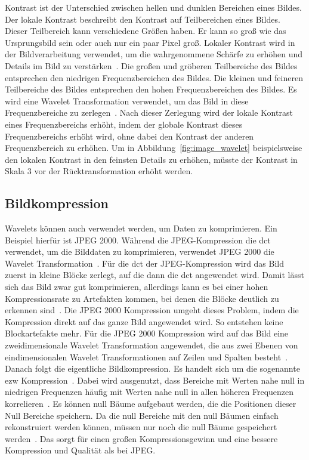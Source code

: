 \documentclass[12pt, a4paper, ngerman]{article}
\begin{document}
Kontrast ist der Unterschied zwischen hellen
und dunklen Bereichen eines Bildes.
Der lokale Kontrast beschreibt
den Kontrast auf Teilbereichen eines Bildes.
Dieser Teilbereich kann verschiedene Größen haben.
Er kann so groß wie das Ursprungsbild sein
oder auch nur ein paar Pixel groß.
Lokaler Kontrast wird in der Bildverarbeitung verwendet, um
die wahrgenommene Schärfe zu erhöhen
und Details im Bild zu verstärken~\cite[S.108]{dt_manual}.
Die großen und gröberen Teilbereiche des Bildes
entsprechen den niedrigen Frequenzbereichen des Bildes.
Die kleinen und feineren Teilbereiche des Bildes
entsprechen den hohen Frequenzbereichen des Bildes.
Es wird eine Wavelet Transformation verwendet, um das Bild
in diese Frequenzbereiche zu zerlegen~\cite[S.107]{dt_manual}.
Nach dieser Zerlegung wird der lokale Kontrast
eines Frequenzbereichs erhöht,
indem der globale Kontrast dieses Frequenzbereichs erhöht wird,
ohne dabei den Kontrast der anderen Frequenzbereich zu erhöhen.
Um in Abbildung~\ref{fig:image_wavelet} beispielsweise
den lokalen Kontrast in den feinsten Details zu erhöhen,
müsste der Kontrast in Skala 3 vor der Rücktransformation erhöht werden.

\subsection{Bildkompression}

Wavelets können auch verwendet werden, um Daten zu komprimieren.
Ein Beispiel hierfür ist JPEG 2000.
Während die JPEG-Kompression die \ac{dct} verwendet,
um die Bilddaten zu komprimieren,
verwendet JPEG 2000 die Wavelet Transformation~\cite[S.1]{jpeg2000}.
Für die \ac{dct} der JPEG-Kompression wird das Bild zuerst in kleine Blöcke zerlegt,
auf die dann die \ac{dct} angewendet wird.
Damit lässt sich das Bild zwar gut komprimieren,
allerdings kann es bei einer hohen Kompressionsrate zu Artefakten kommen,
bei denen die Blöcke deutlich zu erkennen sind~\cite[S.13]{jpeg2000}.
Die JPEG 2000 Kompression umgeht dieses Problem,
indem die Kompression direkt auf das ganze Bild angewendet wird.
So entstehen keine Blockartefakte mehr.
Für die JPEG 2000 Kompression wird auf das Bild 
eine zweidimensionale Wavelet Transformation angewendet,
die aus zwei Ebenen von eindimensionalen 
Wavelet Transformationen auf Zeilen und Spalten besteht~\cite[S.2]{jpeg2000}.
Danach folgt die eigentliche Bildkompression.
Es handelt sich um die sogenannte \ac{ezw} Kompression~\cite[S.1]{jpeg2000}.
Dabei wird ausgenutzt, dass Bereiche mit Werten nahe null in niedrigen Frequenzen 
häufig mit Werten nahe null in allen höheren Frequenzen korrelieren~\cite[S.9]{jpeg2000}.
Es können null Bäume aufgebaut werden, die die Positionen dieser Null Bereiche speichern.
Da die null Bereiche mit den null Bäumen einfach rekonstruiert werden können,
müssen nur noch die null Bäume gespeichert werden~\cite[S.10]{jpeg2000}.
Das sorgt für einen großen Kompressionsgewinn
und eine bessere Kompression und Qualität als bei JPEG.
\end{document}
